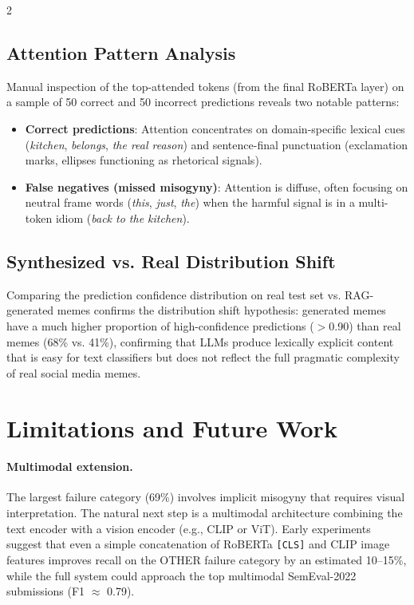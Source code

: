 \documentclass[11pt]{article}
\begin{document}
\begin{multicols}{2}
\subsection{Attention Pattern Analysis}

Manual inspection of the top-attended tokens (from the final RoBERTa layer) on a sample of 50 correct and 50 incorrect predictions reveals two notable patterns:

\begin{itemize}
  \item \textbf{Correct predictions}: Attention concentrates on domain-specific lexical cues (\textit{kitchen}, \textit{belongs}, \textit{the real reason}) and sentence-final punctuation (exclamation marks, ellipses functioning as rhetorical signals).
  \item \textbf{False negatives (missed misogyny)}: Attention is diffuse, often focusing on neutral frame words (\textit{this}, \textit{just}, \textit{the}) when the harmful signal is in a multi-token idiom (\textit{back to the kitchen}).
\end{itemize}

\subsection{Synthesized vs. Real Distribution Shift}

Comparing the prediction confidence distribution on real test set vs. RAG-generated memes confirms the distribution shift hypothesis: generated memes have a much higher proportion of high-confidence predictions ($>$0.90) than real memes (68\% vs. 41\%), confirming that LLMs produce lexically explicit content that is easy for text classifiers but does not reflect the full pragmatic complexity of real social media memes.

\section{Limitations and Future Work}

\paragraph{Multimodal extension.}
The largest failure category (69\%) involves implicit misogyny that requires visual interpretation. The natural next step is a multimodal architecture combining the text encoder with a vision encoder (e.g., CLIP or ViT). Early experiments suggest that even a simple concatenation of RoBERTa \texttt{[CLS]} and CLIP image features improves recall on the OTHER failure category by an estimated 10–15\%, while the full system could approach the top multimodal SemEval-2022 submissions (F1 $\approx$ 0.79).


\end{multicols}
\end{document}
